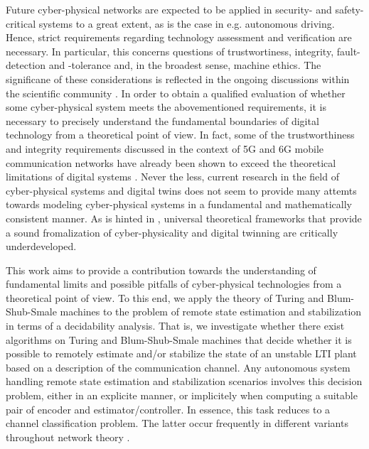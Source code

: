 \documentclass[conference]{IEEEtran}
\newcommand{\revision}[1]{}
\begin{document}
	Future cyber-physical networks are expected to be applied in security- and safety-critical systems to a great extent, as is the case in e.g. autonomous driving.
	Hence, strict requirements regarding technology assessment and verification are necessary. In particular, this concerns questions of trustwortiness, integrity, 
	fault-detection and -tolerance and, in the broadest sense, machine ethics. The significane of these considerations is reflected in the ongoing discussions within the scientific community 
	\cite{RaSaKv20, AwDsKiScHeShBoRa18, ShHeZh16, FeBo21, FeBo22, BoScPo21, GePoBeLuLi21}. 
	In order to obtain a qualified evaluation of whether some cyber-physical system meets the abovementioned requirements, it is necessary to precisely understand 
	the fundamental boundaries of digital technology from a theoretical point of view. In fact, some of the trustworthiness and integrity requirements discussed in the context of 5G and 6G mobile
	communication networks have already been shown to exceed the theoretical limitations of digital systems \cite{FeBo21, FeBo22, BoScPo21, BoBoDe21TAC}. Never the less, current research in the field 
	of cyber-physical systems and digital twins does not seem to provide many attemts towards modeling cyber-physical systems in a fundamental and mathematically consistent manner. 
	As is hinted in \cite{TaZhLiNe19}, universal theoretical frameworks that provide a sound fromalization of cyber-physicality and digital twinning are critically underdeveloped.
	\revision{The ``ongoing discussions within the scientific community'' mentioned above is not limited to one specific nieche of engineering but instead spans a broad range of
	scientific fields.} 
	
	This work aims to provide a contribution towards the understanding of fundamental limits and possible pitfalls of cyber-physical technologies from a theoretical point of view.
	To this end, we apply the theory of Turing and Blum-Shub-Smale machines to the problem of remote state estimation and stabilization in terms of a decidability analysis. That is,
	we investigate whether there exist algorithms on Turing and Blum-Shub-Smale machines that decide whether it is possible to remotely estimate and/or stabilize the state of an unstable LTI plant
	based on a description of the communication channel. Any autonomous system handling remote state estimation and stabilization scenarios involves this decision problem, 
	either in an explicite manner, or implicitely when computing a suitable pair of encoder and estimator/controller.
	In essence, this task reduces to a channel classification problem. The latter occur frequently in different variants throughout network theory \cite{BoScPo21}.   
	
\end{document}
